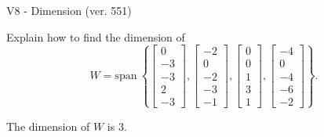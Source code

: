\begin{exercise}
  \begin{exerciseTitle}V8 - Dimension (ver. 551)\end{exerciseTitle}
  \begin{exerciseStatement}
    Explain how to find the dimension of 
\[W=\mathrm{span}\ \left\{\left[\begin{array}{r}
0 \\
-3 \\
-3 \\
2 \\
-3
\end{array}\right] , \left[\begin{array}{r}
-2 \\
0 \\
-2 \\
-3 \\
-1
\end{array}\right] , \left[\begin{array}{r}
0 \\
0 \\
1 \\
3 \\
1
\end{array}\right] , \left[\begin{array}{r}
-4 \\
0 \\
-4 \\
-6 \\
-2
\end{array}\right]\right\}.\]



  \end{exerciseStatement}
  \begin{exerciseAnswer}
   The dimension of \(W\) is  \(3\).
  


  \end{exerciseAnswer}
\end{exercise}